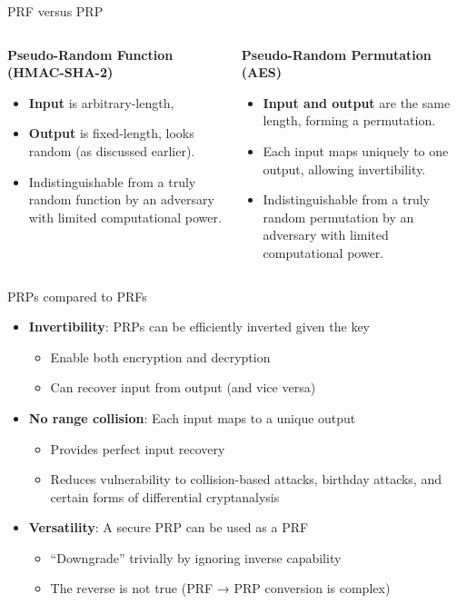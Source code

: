 \documentclass[aspectratio=169, lualatex, handout]{beamer}
\begin{document}
\begin{frame}{PRF versus PRP}
	\begin{columns}[c]
		\begin{column}{0.5\textwidth}
			\textbf{Pseudo-Random Function (HMAC-SHA-2)}
			\begin{itemize}[<+->]
				\item \textbf{Input} is arbitrary-length,
				\item \textbf{Output} is fixed-length, looks random (as discussed
				      earlier).
				\item Indistinguishable from a truly random function by an adversary with
				      limited computational power.
			\end{itemize}
		\end{column}

		\begin{column}{0.5\textwidth}
			\textbf{Pseudo-Random Permutation (AES)}
			\begin{itemize}[<+->]
				\item \textbf{Input and output} are the same length, forming a permutation.
				\item Each input maps uniquely to one output, allowing invertibility.
				\item Indistinguishable from a truly random permutation by an adversary
				      with limited computational power.
			\end{itemize}
		\end{column}
	\end{columns}
\end{frame}

\begin{frame}{PRPs compared to PRFs}
	\begin{itemize}[<+->]
		\item \textbf{Invertibility}: PRPs can be efficiently inverted given the key
		      \begin{itemize}[<+->]
			      \item Enable both encryption and decryption
			      \item Can recover input from output (and vice versa)
		      \end{itemize}
		\item \textbf{No range collision}: Each input maps to a unique output
		      \begin{itemize}[<+->]
			      \item Provides perfect input recovery
			      \item Reduces vulnerability to collision-based attacks, birthday attacks, and certain forms of differential cryptanalysis
		      \end{itemize}
		\item \textbf{Versatility}: A secure PRP can be used as a PRF
		      \begin{itemize}[<+->]
			      \item ``Downgrade'' trivially by ignoring inverse capability
			      \item The reverse is not true (PRF → PRP conversion is complex)
		      \end{itemize}
	\end{itemize}
\end{frame}
\end{document}
